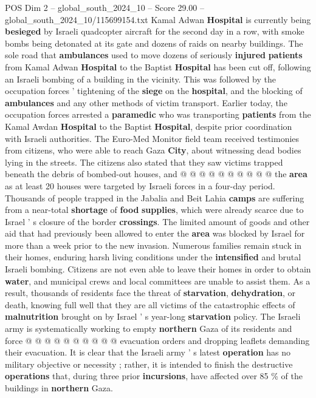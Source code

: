 \begin{textsample}{POS Dim 2 – global\_south\_2024\_10 – Score 29.00 – global\_south\_2024\_10/115699154.txt}
Kamal Adwan \textbf{Hospital} is currently being \textbf{besieged} by Israeli quadcopter aircraft for the second day in a row, with smoke bombs being detonated at its gate and dozens of raids on nearby buildings.
The sole road that \textbf{ambulances} used to move dozens of seriously \textbf{injured} \textbf{patients} from Kamal Adwan \textbf{Hospital} to the Baptist \textbf{Hospital} has been cut off, following an Israeli bombing of a building in the vicinity.
This was followed by the occupation forces ' tightening of the \textbf{siege} on the \textbf{hospital}, and the blocking of \textbf{ambulances} and any other methods of victim transport.
Earlier today, the occupation forces arrested a \textbf{paramedic} who was transporting \textbf{patients} from the Kamal Awdan \textbf{Hospital} to the Baptist \textbf{Hospital}, despite prior coordination with Israeli authorities.
The Euro-Med Monitor field team received testimonies from citizens, who were able to reach Gaza \textbf{City}, about witnessing dead bodies lying in the streets.
The citizens also stated that they saw victims trapped beneath the debris of bombed-out houses, and @ @ @ @ @ @ @ @ @ @ the \textbf{area} as at least 20 houses were targeted by Israeli forces in a four-day period.
Thousands of people trapped in the Jabalia and Beit Lahia \textbf{camps} are suffering from a near-total \textbf{shortage} of \textbf{food} \textbf{supplies}, which were already scarce due to Israel ' s closure of the border \textbf{crossings}.
The limited amount of goods and other aid that had previously been allowed to enter the \textbf{area} was blocked by Israel for more than a week prior to the new invasion.
Numerous families remain stuck in their homes, enduring harsh living conditions under the \textbf{intensified} and brutal Israeli bombing.
Citizens are not even able to leave their homes in order to obtain \textbf{water}, and municipal crews and local committees are unable to assist them.
As a result, thousands of residents face the threat of \textbf{starvation}, \textbf{dehydration}, or death, knowing full well that they are all victims of the catastrophic effects of \textbf{malnutrition} brought on by Israel ' s year-long \textbf{starvation} policy.
The Israeli army is systematically working to empty \textbf{northern} Gaza of its residents and force @ @ @ @ @ @ @ @ @ @ evacuation orders and dropping leaflets demanding their evacuation.
It is clear that the Israeli army ' s latest \textbf{operation} has no military objective or necessity ; rather, it is intended to finish the destructive \textbf{operations} that, during three prior \textbf{incursions}, have affected over 85 \% of the buildings in \textbf{northern} Gaza.

\end{textsample}
